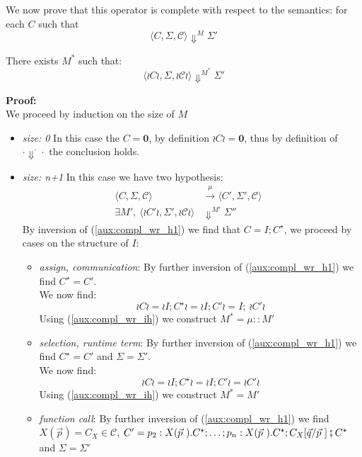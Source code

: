 \documentclass[12pt,a4paper,twoside]{book}
\begin{document}
We now prove that this operator is complete with respect to the semantics: for each $C$ such that
$$
\langle C, \Sigma, \mathscr{C} \rangle \Downarrow^M \Sigma'
$$

There exists $M^*$ such that:
\begin{equation}
\label{aux:compl_wr}
	\langle \wr C \wr, \Sigma, \wr\mathscr{C}\wr \rangle \Downarrow^{M^*} \Sigma'
\end{equation}

\noindent \textbf{Proof:}\\
We proceed by induction on the size of $M$
\begin{itemize}
	\item \emph{size: 0} In this case the $C = \boldsymbol{0}$, by definition
		$\wr C \wr = \boldsymbol{0}$, thus by definition of $\cdot \Downarrow^\cdot \cdot$ the conclusion holds.
	\item \emph{size: n+1} In this case we have two hypothesis:
		\begin{align}
			\langle C, \Sigma, \mathscr{C} \rangle& \xrightarrow{\mu}
			\langle C', \Sigma', \mathscr{C} \rangle& \tag{H1} \label{aux:compl_wr_h1}\\
			\exists M',~\langle \wr C'\wr, \Sigma', \wr \mathscr{C} \wr \rangle& \Downarrow^{M'} \Sigma'' \tag{IH} \label{aux:compl_wr_ih}
		\end{align}
		By inversion of (\ref{aux:compl_wr_h1}) we find that $C = I; C^\star$, we proceed by cases on the structure of $I$:
		\begin{itemize}
			\item \emph{assign, communication}: By further inversion of (\ref{aux:compl_wr_h1}) we find $C^\star = C'$.\\
			We now find:
			$$\wr C \wr = \wr I; C^\star \wr = \wr I; C' \wr = I;~\wr C' \wr$$
				Using (\ref{aux:compl_wr_ih}) we construct $M^* = \mu :: M'$
			\item \emph{selection, runtime term}:
				By further inversion of (\ref{aux:compl_wr_h1}) we find $C^\star = C'$ and $\Sigma = \Sigma'$.\\
			We now find:
			$$\wr C \wr = \wr I; C^\star \wr = \wr I; C' \wr = \wr C' \wr$$
				Using (\ref{aux:compl_wr_ih}) we construct $M^* = M'$
			\item \emph{function call}: By further inversion of (\ref{aux:compl_wr_h1}) we find $X(\vec{p}) = C_X \in \mathscr{C}$, $C' = p_2 : X(\vec{p}~).C^\star; \ldots; p_n : X(\vec{p}~).C^\star; C_X[\vec{q}/\vec{p}~] \fatsemi C^\star$ and $\Sigma = \Sigma'$\\

\end{itemize}
\end{itemize}
\end{document}
